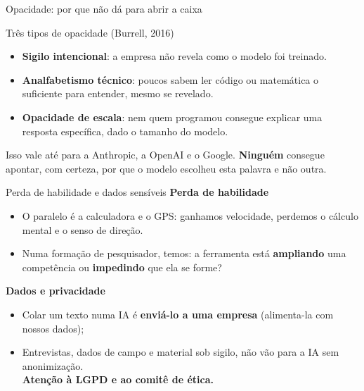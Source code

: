 \documentclass[11pt,aspectratio=169,t]{beamer}
\begin{document}
\begin{frame}{Opacidade: por que não dá para abrir a caixa}
  \small
  \begin{block}{Três tipos de opacidade (Burrell, 2016)}
    \begin{itemize}
      \item \textbf{Sigilo intencional}: a empresa não revela como o modelo foi treinado.
      \item \textbf{Analfabetismo técnico}: poucos sabem ler código ou matemática o suficiente para entender, mesmo se revelado.
      \item \textbf{Opacidade de escala}: nem quem programou consegue explicar uma resposta específica, dado o tamanho do modelo.
    \end{itemize}
  \end{block}
  \pause
  \vfill
  \begin{alertblock}{}
    \centering Isso vale até para a Anthropic, a OpenAI e o Google. \textbf{Ninguém} consegue apontar, com certeza, por que o modelo escolheu esta palavra e não outra.
  \end{alertblock}
\end{frame}
\begin{frame}{Perda de habilidade e dados sensíveis}
  \textbf{Perda de habilidade}
  \begin{itemize}
    \item O paralelo é a calculadora e o GPS: ganhamos velocidade, perdemos o cálculo mental e o senso de direção.
    \item Numa formação de pesquisador, temos: a ferramenta está \textbf{ampliando} uma competência ou \textbf{impedindo} que ela se forme?
  \end{itemize}
  \pause
  \vspace{0.3cm}
  \textbf{Dados e privacidade}
  \begin{itemize}
    \item Colar um texto numa IA é \textbf{enviá-lo a uma empresa} (alimenta-la com nossos dados);
    \item Entrevistas, dados de campo e material sob sigilo, \alert{não vão para a IA} sem anonimização.\\ \textbf{Atenção à LGPD e ao comitê de ética.}
  \end{itemize}
\end{frame}
\end{document}
